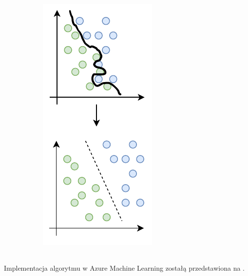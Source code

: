 \begin{figure}[H]
\begin{subfigure}[m]{0.45\textwidth}
    \end{subfigure}
    \hfill
    \begin{subfigure}[m]{0.45\textwidth}
        \centering
        \includegraphics[width=\textwidth]{images/svm_1}
    \end{subfigure}
    \label{fig:svm}
\end{figure}
\ \\
Implementacja algorytmu w Azure Machine Learning zostałą przedstawiona na .

